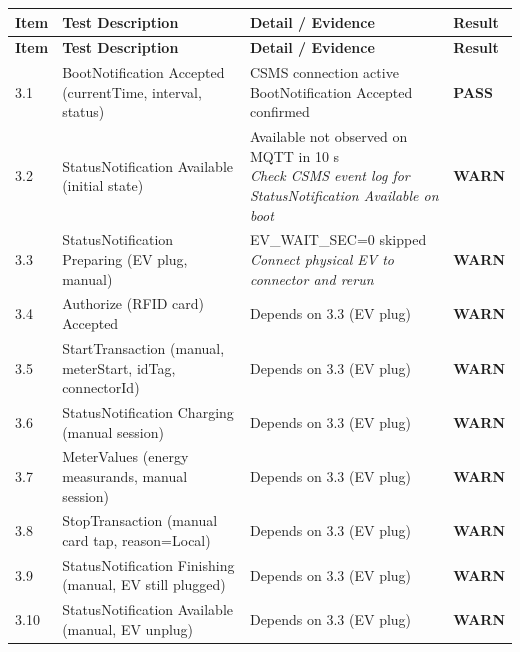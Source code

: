 \documentclass[10pt, a4paper]{article}
\begin{document}
\renewcommand{\arraystretch}{1.35}
\begin{longtable}{|L{1cm}|L{5.5cm}|M{7cm}|C{1.8cm}|}
\hline
{}
\textbf{Item} & \small\textbf{Test Description} & \small\textbf{Detail / Evidence} & \small\textbf{Result} \\
\hline
\endfirsthead
\hline
{}
\textbf{Item} & \small\textbf{Test Description} & \small\textbf{Detail / Evidence} & \small\textbf{Result} \\
\hline
\endhead
\hline
\endfoot
\small 3.1 & \small BootNotification  Accepted (currentTime, interval, status) & CSMS connection active  BootNotification Accepted confirmed & \textcolor{passgreen}{\textbf{PASS}} \\
\hline
\small 3.2 & \small StatusNotification Available (initial state) & Available not observed on MQTT in 10 s{\newline\normalfont\footnotesize\itshape Check CSMS event log for StatusNotification Available on boot} & \textcolor{warnorange}{\textbf{WARN}} \\
\hline
\small 3.3 & \small StatusNotification Preparing (EV plug, manual) & EV\_WAIT\_SEC=0  skipped{\newline\normalfont\footnotesize\itshape Connect physical EV to connector and rerun} & \textcolor{warnorange}{\textbf{WARN}} \\
\hline
\small 3.4 & \small Authorize (RFID card)  Accepted & Depends on 3.3 (EV plug) & \textcolor{warnorange}{\textbf{WARN}} \\
\hline
\small 3.5 & \small StartTransaction (manual, meterStart, idTag, connectorId) & Depends on 3.3 (EV plug) & \textcolor{warnorange}{\textbf{WARN}} \\
\hline
\small 3.6 & \small StatusNotification Charging (manual session) & Depends on 3.3 (EV plug) & \textcolor{warnorange}{\textbf{WARN}} \\
\hline
\small 3.7 & \small MeterValues (energy measurands, manual session) & Depends on 3.3 (EV plug) & \textcolor{warnorange}{\textbf{WARN}} \\
\hline
\small 3.8 & \small StopTransaction (manual card tap, reason=Local) & Depends on 3.3 (EV plug) & \textcolor{warnorange}{\textbf{WARN}} \\
\hline
\small 3.9 & \small StatusNotification Finishing (manual, EV still plugged) & Depends on 3.3 (EV plug) & \textcolor{warnorange}{\textbf{WARN}} \\
\hline
\small 3.10 & \small StatusNotification Available (manual, EV unplug) & Depends on 3.3 (EV plug) & \textcolor{warnorange}{\textbf{WARN}} \\

\end{longtable}
\end{document}
